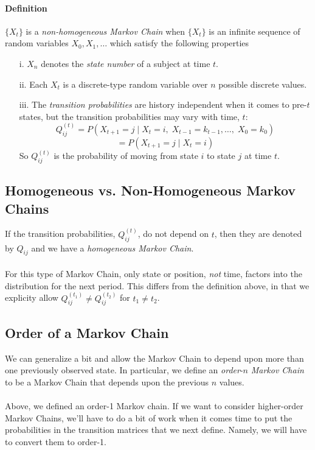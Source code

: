 \documentclass[12pt]{article}
\theoremstyle{plain}
\theoremstyle{definition}
\theoremstyle{remark}
\begin{document}
\paragraph{Definition} $\{X_t\}$ is a {\sl non-homogeneous Markov Chain}
when $\{X_t\}$ is an infinite sequence of random variables $X_0, X_1,\ldots$
which satisfy the following properties
\begin{enumerate}
   \item[i.]{$X_n$ denotes the \emph{state number} of a subject at time
      $t$.}
   \item[ii.]{Each $X_t$ is a discrete-type random variable over $n$
      possible discrete values.}
   \item[iii.]{The {\sl transition probabilities} are history
      independent when it comes to pre-$t$ states, 
      but the transition probabilities may vary with time, $t$:
      \[ Q_{ij}^{(t)} = P( X_{t+1}=j \; | \; X_t = i, \; X_{t-1}=k_{t-1},
	 \ldots,\; X_0 = k_0 ) \]
      \[ =P(X_{t+1} = j \; | \; X_t = i ) \]
      So $Q_{ij}^{(t)}$ is the probability of moving from
      state $i$ to state $j$ at time $t$.
      }
\end{enumerate}

\subsection{Homogeneous vs. Non-Homogeneous Markov Chains}
If the transition probabilities, $Q^{(t)}_{ij}$, do
not depend on $t$, then they are denoted by $Q_{ij}$ and we have
a {\sl homogeneous Markov Chain}. 
\\
\\
For this type of Markov Chain, 
only state or position, \emph{not} time, factors into the distribution for the
next period. This differs from the definition above, in that we explicity allow $Q_{ij}^{(t_1)} \neq Q_{ij}^{(t_2)}$ for 
$t_1\neq t_2$.


\subsection{Order of a Markov Chain}
We can generalize a bit and allow the Markov Chain to depend upon more
than one previously observed state.  In particular, we define an 
{\sl order}-${n}$ {\sl Markov Chain} to be a Markov Chain that 
depends upon the previous $n$ values.  
\\
\\
Above, we defined an order-1 Markov chain. If we want to consider 
higher-order Markov Chains, we'll have to do a bit of work when it
comes time to put the probabilities in the transition matrices that
we next define. Namely, we will have to convert them to order-1.
\end{document}
